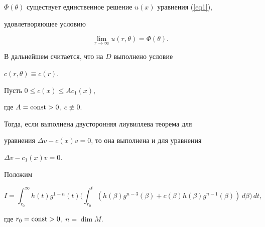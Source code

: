 $\Phi(\theta)$ существует единственное решение $u(x)$ уравнения (\ref{eq1}),


удовлетворяющее условию


$$


\lim_{r\to\infty}u(r,\theta)=\Phi(\theta).


$$





В дальнейшем считается, что на $D$ выполнено условие


$c(r,\theta)\equiv c(r)$.





\begin{note}


Пусть $0\le c(x)\le Ac_1(x)$,


где $A=\operatorname{const} >0$, $c\not\equiv 0$.


Тогда, если выполнена двусторонняя лиувиллева теорема для


уравнения $\Delta v-c(x)v=0$, то она выполнена и для уравнения


$\Delta v-c_1(x)v=0$.


\end{note}





Положим


$$


I=\int_{r_0}^{\infty} h(t)g^{1-n}(t)\biggl(\int_{r_0}^t (h(\beta)g^{n-3}


(\beta)+c(\beta)h(\beta)g^{n-1}(\beta))\,d\beta\biggr)\,dt,


$$


где $r_0=\operatorname{const} >0$, $n=\dim M$.





